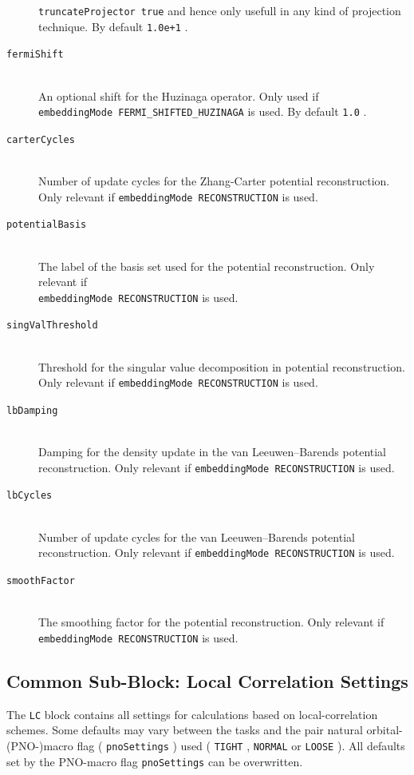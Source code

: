 \documentclass[bibliography=totocnumbered,a4paper,10pt,oneside]{scrbook}
\newcommand{\ttt}[1]{%
  \begingroup\setlength{\fboxsep}{1pt}%
  \colorbox{serenity-green!30}{\texttt{\hspace*{2pt}\vphantom{(g}#1\hspace*{2pt}}}%
  \endgroup
}
\begin{document}
\begin{description}
    \ttt{truncateProjector true} and hence only usefull in any kind of projection technique.
    By default \ttt{1.0e+1}.
  \item [\texttt{fermiShift}]\hfill \\
    An optional shift for the Huzinaga operator. Only used if\\ \ttt{embeddingMode FERMI\_SHIFTED\_HUZINAGA} is
    used. By default \ttt{1.0}.
  \item [\texttt{carterCycles}]\hfill \\
    Number of update cycles for the Zhang-Carter potential reconstruction. Only relevant if
    \ttt{embeddingMode RECONSTRUCTION} is used.
  \item [\texttt{potentialBasis}]\hfill \\
    The label of the basis set used for the potential reconstruction. Only relevant if\\
    \ttt{embeddingMode RECONSTRUCTION} is used.
  \item [\texttt{singValThreshold}]\hfill \\
    Threshold for the singular value decomposition in potential reconstruction. Only relevant if
    \ttt{embeddingMode RECONSTRUCTION} is used.
  \item [\texttt{lbDamping}]\hfill \\
    Damping for the density update in the van Leeuwen--Barends potential reconstruction. Only relevant if
    \ttt{embeddingMode RECONSTRUCTION} is used.
  \item [\texttt{lbCycles}]\hfill \\
    Number of update cycles for the van Leeuwen--Barends potential reconstruction. Only relevant if
    \ttt{embeddingMode RECONSTRUCTION} is used.
  \item [\texttt{smoothFactor}]\hfill \\
    The smoothing factor for the potential reconstruction. Only relevant if\\
    \ttt{embeddingMode RECONSTRUCTION} is used.
\end{description}

\subsection{Common Sub-Block: Local Correlation Settings}
The \texttt{LC} block contains all settings for calculations based on local-correlation schemes.
Some defaults may vary between the tasks and the pair natural orbital-(PNO-)macro flag
(\ttt{pnoSettings}) used (\ttt{TIGHT}, \ttt{NORMAL} or \ttt{LOOSE}).
All defaults set by the PNO-macro flag \ttt{pnoSettings} can be overwritten.
\end{document}
